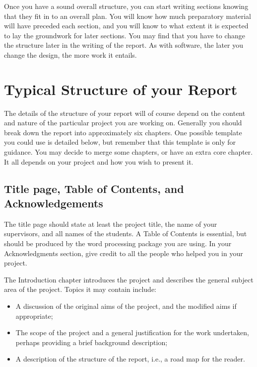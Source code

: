 \documentclass[]{final_report}
\begin{document}
Once you have a sound overall structure, you can start writing sections knowing that they fit in to an overall plan. You will know how much preparatory material will have preceded each section, and you will know to what extent it is expected to lay the groundwork for later sections. You may find that you have to change the structure later in the writing of the report. As with software, the later you change the design, the more work it entails.


\section{Typical Structure of your Report}

The details of the structure of your report will of course depend on the content and nature of the particular project you are working on. Generally you should break down the report into approximately six chapters. One possible template you could use is detailed below, but remember that this template is only for guidance. You may decide to merge some chapters, or have an extra core chapter. It all depends on your project and how you wish to present it.

\subsection{Title page, Table of Contents, and Acknowledgements}

The title page should state at least the project title, the name of your supervisors, and all names of the students. A Table of Contents is essential, but should be produced by the word processing package you are using. In your Acknowledgments section, give credit to all the people who helped you in your project.


The Introduction chapter introduces the project and describes the general subject area of the project. Topics it may contain include:

\begin{itemize}
\item A discussion of the original aims of the project, and the modified aims if appropriate;
\item The scope of the project and a general justification for the work undertaken, perhaps providing a brief background description;
\item A description of the structure of the report, i.e., a road map for the reader.
\end{itemize}
\end{document}

